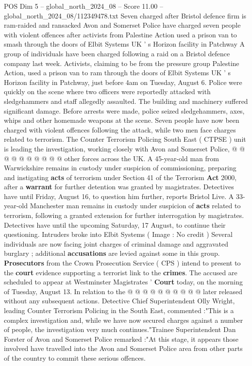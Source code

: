 \begin{textsample}{POS Dim 5 – global\_north\_2024\_08 – Score 11.00 – global\_north\_2024\_08/112349478.txt}  \label{ex:f5_pos_396}
Seven charged after Bristol defence firm is ram-raided and ransacked Avon and Somerset Police have charged seven people with violent offences after activists from Palestine Action used a prison van to smash through the doors of Elbit Systems UK ' s Horizon facility in Patchway A group of individuals have been charged following a raid on a Bristol defence company last week.
Activists, claiming to be from the pressure group Palestine Action, used a prison van to ram through the doors of Elbit Systems UK ' s Horizon facility in Patchway, just before 4am on Tuesday, August 6.
Police were quickly on the scene where two officers were reportedly attacked with sledgehammers and staff allegedly assaulted.
The building and machinery suffered significant damage.
Before arrests were made, police seized sledgehammers, axes, whips and other homemade weapons at the scene.
Seven people have now been charged with violent offences following the attack, while two men face charges related to terrorism.
The Counter Terrorism Policing South East ( CTPSE ) unit is leading the investigation, working closely with Avon and Somerset Police, @ @ @ @ @ @ @ @ @ @ other forces across the UK.
A 45-year-old man from Warwickshire remains in custody under suspicion of commissioning, preparing and instigating \textbf{acts} of terrorism under Section 41 of the Terrorism \textbf{Act} 2000, after a \textbf{warrant} for further detention was granted by magistrates.
Detectives have until Friday, August 16, to question him further, reports Bristol Live.
A 33-year-old Manchester man remains in custody under suspicion of \textbf{acts} related to terrorism, following a granted extension for further interrogation by magistrates.
Detectives have until the upcoming Saturday, 17 August, to continue their questioning.
Intruders broke into Elbit Systems ( Image : No credit ) Several individuals are now facing joint charges of criminal damage and aggravated burglary ; additional \textbf{accusations} are levied against some in this group. \textbf{Prosecutors} from the Crown Prosecution Service ( CPS ) intend to present to the \textbf{court} evidence supporting a terrorist link to the \textbf{crimes}.
The accused are scheduled to appear at Westminster Magistrates ' \textbf{Court} today, on the morning of Tuesday, August 13.
In relation to the @ @ @ @ @ @ @ @ @ @ later released without any subsequent actions.
Detective Chief Superintendent Olly Wright, leading Counter Terrorism Policing in the South East, commented :"This is a complex investigation and, while we have now secured charges against a number of people, the investigation very much continues."Trainee Superintendent Dan Forster of Avon and Somerset Police remarked :"At this stage, it appears those involved have travelled into the Avon and Somerset Police area from other parts of the country to commit these serious offences.

\end{textsample}
